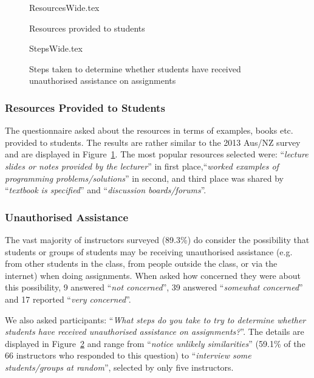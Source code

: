 \documentclass[english,submission]{programming}
\begin{document}
\begin{figure}
\begin{center}
{ResourcesWide.tex}
\end{center}\vskip-18pt
\caption{Resources provided to students\label{fig:Resources}}
\end{figure}

\begin{figure}
\begin{center}
{StepsWide.tex}
\end{center}
\caption{Steps taken to determine whether students have received unauthorised assistance on assignments\label{fig:Plagiarise}}
\end{figure}

\subsubsection{Resources Provided to Students}

The questionnaire asked about the resources in terms of examples,
books etc. provided to students. The results are rather similar to the
2013 Aus/NZ survey~\cite[Figure 14]{mason+cooper:2014} and are
displayed in Figure~\ref{fig:Resources}. The most popular resources
selected were: ``{\emph{lecture slides or notes provided by the
lecturer}}'' in first place,``{\emph{worked examples of programming
problems/solutions}}'' in second, and third place was shared by
``{\emph{textbook is specified}}'' and ``{\emph{discussion
boards/forums}}''.

\subsubsection{Unauthorised Assistance}

The vast majority of instructors surveyed (89.3\%) do consider the
possibility that students or groups of students may be receiving
unauthorised assistance (e.g. from other students in the class, from
people outside the class, or via the internet) when doing
assignments. When asked how concerned they were about this
possibility, 9 answered ``{\emph{not concerned}}'', 39 answered
``{\emph{somewhat concerned}}'' and 17 reported ``{\emph{very
concerned}}''.

We also asked participants: ``{\emph{What steps do you take to try to
determine whether students have received unauthorised assistance on
assignments?}}''. The details are displayed in
Figure~\ref{fig:Plagiarise} and range from ``{\emph{notice unlikely
similarities}}'' (59.1\% of the 66 instructors who responded to this
question) to ``{\emph{interview some students/groups at random}}'',
selected by only five instructors.
\end{document}
